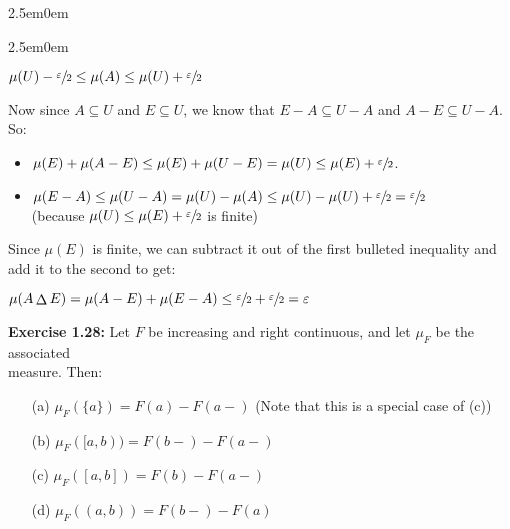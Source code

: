 \documentclass{book}
\newcommand{\exOne}{%
   \color{Purple}%
   \fontsize{13}{15}\selectfont%
}
\newcommand{\exPPP}{%
   \color{VioletRed}%
   \fontsize{12}{14}\selectfont%
}
\newenvironment{myIndent}{%
   \begin{adjustwidth}{2.5em}{0em}%
}{%
   \end{adjustwidth}%
}
\newcommand{\blab}[1]{\textbf{#1}}
\newcommand{\retTwo}{\hfill\bigbreak}
\begin{document}
\begin{myIndent}
\begin{myIndent}
      {\centering $\mu(U) - \sfrac{\varepsilon}{2} \leq \mu(A) \leq \mu(U) + \sfrac{\varepsilon}{2}$ \retTwo\par}

      Now since $A \subseteq U$ and $E \subseteq U$, we know that $E - A \subseteq U - A$ and $A - E \subseteq U - A$. So:
      \begin{itemize}
         \item $\mu(E) + \mu(A - E) \leq \mu(E) + \mu(U - E) = \mu(U) \leq \mu(E) + \sfrac{\varepsilon}{2}$.
         \item $\mu(E - A) \leq \mu(U - A) = \mu(U) - \mu(A) \leq \mu(U) - \mu(U) + \sfrac{\varepsilon}{2} = \sfrac{\varepsilon}{2}$\\ \phantom{aaaaaaaaaaaaaaaaaaaaaaaaaaaaaaa} {\exPPP (because $\mu(U) \leq \mu(E) + \sfrac{\varepsilon}{2}$ is finite)}\retTwo
      \end{itemize}

      Since $\mu(E)$ is finite, we can subtract it out of the first bulleted inequality and add it to the second to get:

      {\centering $\mu(A \mathop{\Delta} E) = \mu(A - E) + \mu(E - A) \leq \sfrac{\varepsilon}{2} + \sfrac{\varepsilon}{2} = \varepsilon$ \newpage\par}

   \end{myIndent}
\end{myIndent}

\exOne
\blab{Exercise 1.28:} Let $F$ be increasing and right continuous, and let $\mu_F$ be the associated\\ measure. Then:

\begin{itemize}
   \item[(a)] $\mu_F(\{a\}) = F(a) - F(a-)$ {\exPPP (Note that this is a special case of (c))}
   \item[(b)] $\mu_F([a, b)) = F(b-) - F(a-)$
   \item[(c)] $\mu_F([a, b]) = F(b) - F(a-)$
   \item[(d)] $\mu_F((a, b)) = F(b-) - F(a)$
\end{itemize}
\end{document}
